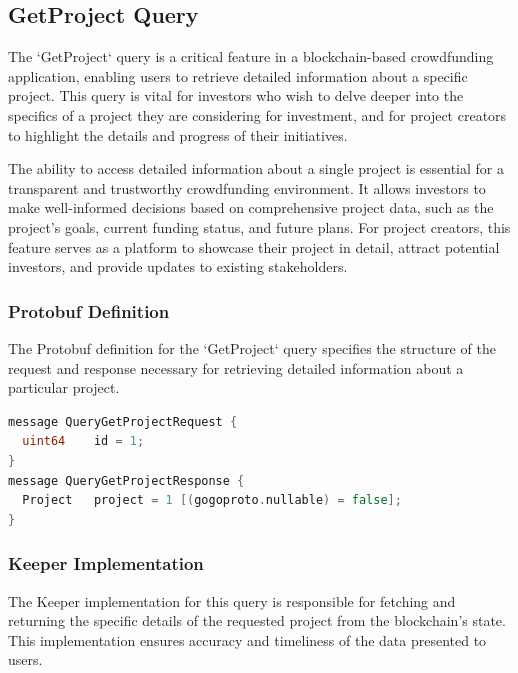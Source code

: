 
\subsection{GetProject Query}

The `GetProject` query is a critical feature in a blockchain-based crowdfunding application, enabling users to retrieve detailed information about a specific project. This query is vital for investors who wish to delve deeper into the specifics of a project they are considering for investment, and for project creators to highlight the details and progress of their initiatives.

The ability to access detailed information about a single project is essential for a transparent and trustworthy crowdfunding environment. It allows investors to make well-informed decisions based on comprehensive project data, such as the project's goals, current funding status, and future plans. For project creators, this feature serves as a platform to showcase their project in detail, attract potential investors, and provide updates to existing stakeholders.

\subsubsection{Protobuf Definition}

The Protobuf definition for the `GetProject` query specifies the structure of the request and response necessary for retrieving detailed information about a particular project.

\begin{lstlisting}[language=go, caption={Protobuf Definition for GetProject Query}]
message QueryGetProjectRequest {
  uint64    id = 1;
}
message QueryGetProjectResponse {
  Project   project = 1 [(gogoproto.nullable) = false];
}
\end{lstlisting}

\subsubsection{Keeper Implementation}

The Keeper implementation for this query is responsible for fetching and returning the specific details of the requested project from the blockchain's state. This implementation ensures accuracy and timeliness of the data presented to users.

